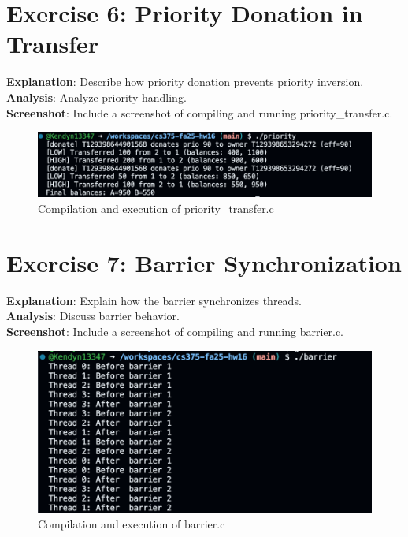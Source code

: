 \documentclass{article}
\begin{document}
\section{Exercise 6: Priority Donation in Transfer}

\textbf{Explanation}: Describe how priority donation prevents priority inversion.\\
\textbf{Analysis}: Analyze priority handling.\\
\textbf{Screenshot}: Include a screenshot of compiling and running priority\_transfer.c.
\begin{figure}[H]
    \centering
    \includegraphics[width=\textwidth]{priority.png}
    \caption{Compilation and execution of priority\_transfer.c}
\end{figure}

\section{Exercise 7: Barrier Synchronization}

\textbf{Explanation}: Explain how the barrier synchronizes threads.\\
\textbf{Analysis}: Discuss barrier behavior.\\
\textbf{Screenshot}: Include a screenshot of compiling and running barrier.c.
\begin{figure}[H]
    \centering
    \includegraphics[width=\textwidth]{barrier.png}
    \caption{Compilation and execution of barrier.c}
\end{figure}
\end{document}

